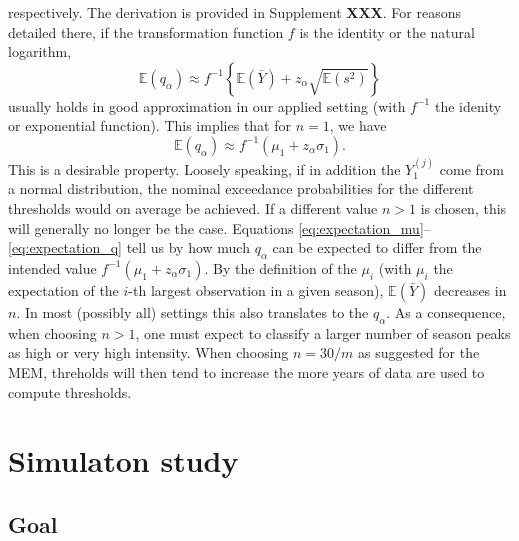 \documentclass{article}
\newcommand{\sd}{s}
\newcommand{\mean}{\bar{Y}}
\begin{document}
respectively. The derivation is provided in Supplement \textbf{XXX}. For reasons detailed there, if the transformation function $f$ is the identity or the natural logarithm,
\begin{equation}
\mathbb{E}(q_\alpha) \approx f^{-1}\left\{\mathbb{E}(\mean) + z_\alpha \sqrt{\mathbb{E}(\sd^2)}\right\}
\label{eq:expectation_q}
\end{equation}
usually holds in good approximation in our applied setting (with $f^{-1}$ the idenity or exponential function). This implies that for $n = 1$, we have
$$
\mathbb{E}(q_\alpha) \approx f^{-1}(\mu_1 + z_\alpha \sigma_1).
$$
This is a desirable property. Loosely speaking, if in addition the $Y_{1}^{(j)}$ come from a normal distribution, the nominal exceedance probabilities for the different thresholds would on average be achieved. If a different value $n > 1$ is chosen, this will generally no longer be the case. Equations \eqref{eq:expectation_mu}--\eqref{eq:expectation_q} tell us by how much $q_\alpha$ can be expected to differ from the intended value $f^{-1}(\mu_1 + z_\alpha \sigma_1)$. By the definition of the $\mu_i$ (with $\mu_i$ the expectation of the $i$-th largest observation in a given season), $\mathbb{E}(\mean)$ decreases in $n$. In most (possibly all) settings this also translates to the $q_\alpha$. As a consequence, when choosing $n > 1$, one must expect to classify a larger number of season peaks as high or very high intensity. When choosing $n = 30/m$ as suggested for the MEM, threholds will then tend to increase the more years of data are used to compute thresholds.

\section{Simulaton study}
\label{sec:simulation}

\subsection{Goal}
\label{subsec:simulation_goal}
\end{document}
